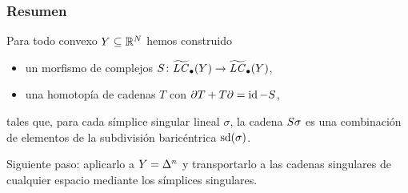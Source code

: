 \begin{frame}
  \frametitle{Resumen}

  Para todo convexo $Y\subseteq\mathbb{R}^N$ hemos construido
  \begin{itemize}
    \item un morfismo de complejos $S\colon\widetilde{\mathit{LC}}_\bullet(Y)\to\widetilde{\mathit{LC}}_\bullet(Y)$,
    \item una homotopía de cadenas $T$ con $\partial T+T\partial=\operatorname{id}-S$,
  \end{itemize}
  tales que, para cada símplice singular lineal $\sigma$, la cadena
  $S\sigma$ es una combinación de elementos de la subdivisión
  baricéntrica $\operatorname{sd}(\sigma)$.

  \medskip

  Siguiente paso: aplicarlo a $Y=\Delta^{n}$ y transportarlo a las cadenas
  singulares de cualquier espacio mediante los símplices singulares.
\end{frame}
